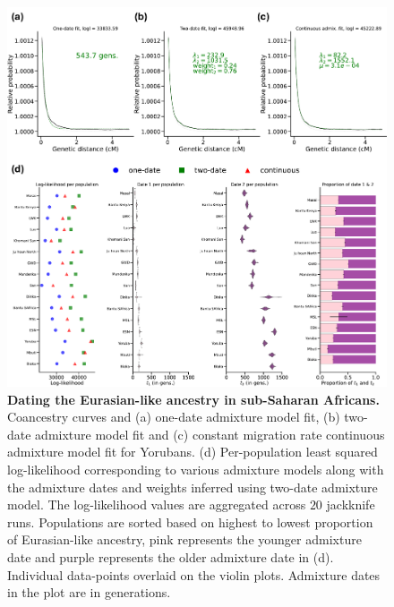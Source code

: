 \begin{figure}[h!]
    \centering
    \includegraphics[width=\linewidth]{figures/gb_bta/gb_real_bta_3.pdf}
    \captionsetup{width=\textwidth+3cm}
    \caption{
    \footnotesize
    \textbf{Dating the Eurasian-like ancestry in sub-Saharan Africans.} Coancestry curves and (a) one-date admixture model fit, (b) two-date admixture model fit and (c) constant migration rate continuous admixture model fit for Yorubans. (d) Per-population least squared log-likelihood corresponding to various admixture models along with the admixture dates and weights inferred using two-date admixture model. The log-likelihood values are aggregated across $20$ jackknife runs. Populations are sorted based on highest to lowest proportion of Eurasian-like ancestry, pink represents the younger admixture date and purple represents the older admixture date in (d). Individual data-points overlaid on the violin plots. Admixture dates in the plot are in generations.
    }
    \label{fig:gb_bta_3}
\end{figure}

